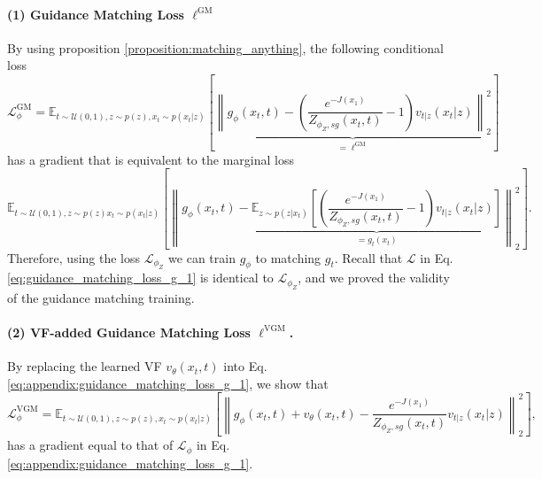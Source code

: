 \paragraph{(1) Guidance Matching Loss $\ell^{\text{GM}}$}
By using proposition \ref{proposition:matching_anything}, the following conditional loss
\begin{equation}\label{eq:appendix:guidance_matching_loss_g_1}
    \mathcal{L}_{\phi}^{\text{GM}} = \mathbb{E}_{t\sim\mathcal{U}(0,1),z\sim p(z),x_t \sim p(x_t|z)}\left[\underbrace{\left\|g_{\phi}(x_t,t) - (\frac{e^{-J(x_1)}}{Z_{\phi_Z,sg}(x_t,t)} - 1) v_{t|z}(x_t|z)\right\|_2^2}_{=\ell^{\text{GM}}}\right]
\end{equation}
has a gradient that is equivalent to the marginal loss
\begin{equation}
    \mathbb{E}_{t\sim\mathcal{U}(0,1),z\sim p(z)x_t \sim p(x_t|z)}\left[\left\|g_{\phi}(x_t,t) - \underbrace{\mathbb{E}_{z\sim p(z|x_t)}\left[(\frac{e^{-J(x_1)}}{Z_{\phi_Z,sg}(x_t,t)} - 1) v_{t|z}(x_t|z)\right]}_{=g_t(x_t)}\right\|_2^2\right].
\end{equation}
Therefore, using the loss $\mathcal{L}_{\phi_Z}$ we can train $g_\phi$ to matching $g_t$. Recall that $\mathcal{L}$ in Eq. \eqref{eq:guidance_matching_loss_g_1} is identical
to $\mathcal{L}_{\phi_Z}$, and we proved the validity of the guidance matching training.

\paragraph{(2) VF-added Guidance Matching Loss $\ell^{\text{VGM}}$.} By replacing the learned VF $v_\theta(x_t, t)$ into Eq. \eqref{eq:appendix:guidance_matching_loss_g_1}, we show that  
\begin{equation}
\label{eq:appendix:guidance_matching_loss_g_2}
    \mathcal{L}_{\phi}^{\text{VGM}} = \mathbb{E}_{t\sim\mathcal{U}(0,1),z\sim p(z),x_t \sim p(x_t|z)}\left[\left\|g_{\phi}(x_t,t) + v_\theta(x_t,t) - \frac{e^{-J(x_1)}}{Z_{\phi_Z,sg}(x_t,t)}v_{t|z}(x_t|z)\right\|_2^2\right],
\end{equation}
has a gradient equal to that of $\mathcal{L}_{\phi}$ in Eq. \eqref{eq:appendix:guidance_matching_loss_g_1}.


